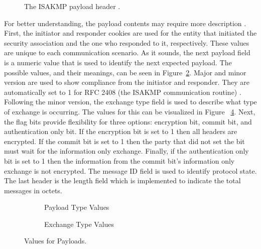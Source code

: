 \documentclass[12pt, letterpaper, twoside]{article}
\begin{document}
\begin{figure}[hbtp]
\centering
  
  \caption{The ISAKMP payload header \cite{ISAKMP}.}
  \label{fig:payload_header}
\end{figure}

For better understanding, the payload contents may require more description \cite{ISAKMP}. First, the initiator and responder cookies are used for the entity that initiated the security association and the one who responded to it, respectively. These values are unique to each communication scenario. As it sounds, the next payload field is a numeric value that is used to identify the next expected payload. The possible values, and their meanings, can be seen in Figure~\ref{fig:payloadtype}. Major and minor version are used to show compliance from the initiator and responder. They are automatically set to 1 for RFC 2408 (the ISAKMP communication routine) \cite{ISAKMP}. Following the minor version, the exchange type field is used to describe what type of exchange is occurring. The values for this can be visualized in Figure ~\ref{fig:exchangetype}. Next, the flag bits provide flexibility for three options: encryption bit, commit bit, and authentication only bit. If the encryption bit is set to 1 then all headers are encrypted. If the commit bit is set to 1 then the party that did not set the bit must wait for the information only exchange. Finally, if the authentication only bit is set to 1 then the information from the commit bit's information only exchange is not encrypted. The message ID field is used to identify protocol state. The last header is the length field which is implemented to indicate the total messages in octets. 


\begin{figure}
    \centering
    \begin{subfigure}[b]{0.4\textwidth}
        \centering
        \resizebox{\linewidth}{!}{} 
        \caption{Payload Type Values \cite{ISAKMP}}
        \label{fig:payloadtype}
    \end{subfigure}
    \begin{subfigure}[b]{0.4\textwidth}
        \centering
        \resizebox{\linewidth}{!}{}
        \caption{Exchange Type Values \cite{ISAKMP}}
        \label{fig:exchangetype}
    \end{subfigure} 
    \caption{Values for Payloads.}
\end{figure}
\end{document}
